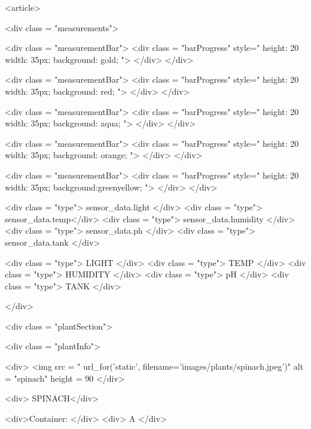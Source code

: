 \documentclass[12pt]{article} %
\begin{document}
\begin{htmlcode}[caption={Plant Page HTML}]
         <article>
          
         <div class = "measurements">
    
         <div class = "measurementBar"> 
          <div class = "barProgress" style="  
          height: 20%
          width: 35px;
          background: gold; "> 
          </div>
          </div> 
    
         <div class = "measurementBar"> 
          <div class = "barProgress" style="   
          height: 20%
          width: 35px;
          background: red; "> 
          </div>
          </div> 
    
         <div class = "measurementBar"> 
          <div class = "barProgress" style="   
          height: 20%
          width: 35px;
          background: aqua; "> 
          </div>
          </div> 
    
         <div class = "measurementBar"> 
          <div class = "barProgress" style="   
          height: 20%
          width: 35px;
          background: orange; "> 
          </div>
          </div> 
    
         <div class = "measurementBar"> 
          <div class = "barProgress" style="   
          height: 20%
          width: 35px;
          background:greenyellow; "> 
          </div>
          </div> 
     
    
         <div class = "type"> {{sensor_data.light}} </div>
         <div class = "type"> {{sensor_data.temp}}</div>
         <div class = "type"> {{sensor_data.humidity}} </div>
         <div class = "type"> {{sensor_data.ph}} </div>
         <div class = "type"> {{sensor_data.tank}} </div>
    
         <div class = "type"> LIGHT </div>
         <div class = "type"> TEMP </div>
         <div class = "type"> HUMIDITY </div>
         <div class = "type"> pH </div>
         <div class = "type"> TANK </div>
    
         </div>
    
        <div class = "plantSection">
    
         <div class = "plantInfo">
    
          <div>
             <img src = "{{ url_for('static', filename='images/plants/spinach.jpeg')}}" alt = "spinach" height = 90%
          </div>
         
          <div> SPINACH</div>
    
          <div>Container: </div>
          <div> A </div>
    

\end{htmlcode}
\end{document}
